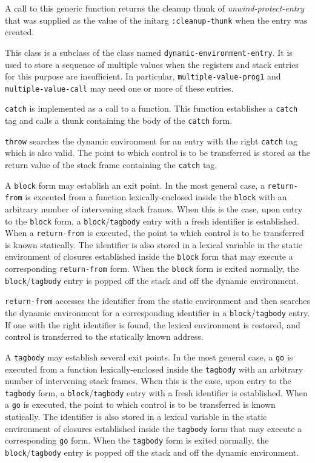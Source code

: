 A call to this generic function returns the cleanup thunk of
\textit{unwind-protect-entry} that was supplied as the value of the
initarg \texttt{:cleanup-thunk} when the entry was created.


This class is a subclass of the class named
\texttt{dynamic-environment-entry}.  It is used to store a sequence of
multiple values when the registers and stack entries for this purpose
are insufficient.  In particular, \texttt{multiple-value-prog1} and
\texttt{multiple-value-call} may need one or more of these entries.

\texttt{catch} is implemented as a call to a function.  This function
establishes a \texttt{catch} tag and calls a thunk containing the body
of the \texttt{catch} form.

\texttt{throw} searches the dynamic environment for an entry with the
right \texttt{catch} tag which is also valid.  The point to which
control is to be transferred is stored as the return value of the
stack frame containing the \texttt{catch} tag.

A \texttt{block} form may establish an exit point.  In the most
general case, a \texttt{return-from} is executed from a function
lexically-enclosed inside the \texttt{block} with an arbitrary number
of intervening stack frames.  When this is the case, upon entry to the
\texttt{block} form, a \texttt{block}/\texttt{tagbody} entry with a
fresh identifier is established.  When a \texttt{return-from} is
executed, the point to which control is to be transferred is known
statically.  The identifier is also stored in a lexical variable in
the static environment of closures established inside the
\texttt{block} form that may execute a corresponding
\texttt{return-from} form.  When the \texttt{block} form is exited normally, the
\texttt{block}/\texttt{tagbody} entry is popped off the stack and off
the dynamic environment.

\texttt{return-from} accesses the identifier from the static
environment and then searches the dynamic environment for a
corresponding identifier in a \texttt{block}/\texttt{tagbody} entry.
If one with the right identifier is found, the lexical environment is
restored, and control is transferred to the statically known address.

A \texttt{tagbody} may establish several exit points.  In the most
general case, a \texttt{go} is executed from a function
lexically-enclosed inside the \texttt{tagbody} with an arbitrary
number of intervening stack frames.  When this is the case, upon entry
to the \texttt{tagbody} form, a \texttt{block}/\texttt{tagbody} entry
with a fresh identifier is established.  When a \texttt{go} is
executed, the point to which control is to be transferred is known
statically.  The identifier is also stored in a lexical variable in
the static environment of closures established inside the
\texttt{tagbody} form that may execute a corresponding \texttt{go}
form.  When the \texttt{tagbody} form is exited normally, the
\texttt{block}/\texttt{tagbody} entry is popped off the stack and off
the dynamic environment.

